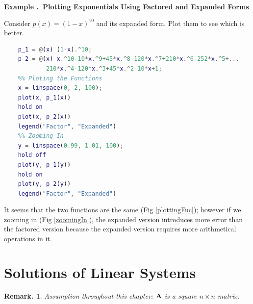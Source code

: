 \documentclass[12pt, a4paper]{article}
\newcounter{index}[subsection]
\newenvironment*{eg}[1]{\begin{framed}\par\noindent\textbf{Example \thesubsection.\stepcounter{index}\theindex\ #1} \par}{\par\end{framed}}
\newtheorem{rmk}{Remark.}[section]
\def\A{\vb A}
\begin{document}
\begin{eg}{Plotting Exponentials Using Factored and Expanded Forms}
	Consider $p(x)=(1-x)^{10}$ and its expanded form.
	Plot them to see which is better. 
	\begin{lstlisting}[language = Matlab, title = {Example 1.4.5}]
	%% Defining the Functions
	p_1 = @(x) (1-x).^10;
	p_2 = @(x) x.^10-10*x.^9+45*x.^8-120*x.^7+210*x.^6-252*x.^5+...
			210*x.^4-120*x.^3+45*x.^2-10*x+1;
	%% Ploting the Functions
	x = linspace(0, 2, 100);
	plot(x, p_1(x))
	hold on
	plot(x, p_2(x))
	legend("Factor", "Expanded")
	%% Zooming In
	y = linspace(0.99, 1.01, 100);
	hold off
	plot(y, p_1(y))
	hold on
	plot(y, p_2(y))
	legend("Factor", "Expanded")
	\end{lstlisting}
	\begin{figure}[H]\centering
	\hfill
	\end{figure}
	It seems that the two functions are the same (Fig \ref{plottingFuc}); however if we zooming in (Fig \ref{zoomingIn}), the expanded version introduces more error than the factored version because the expanded version requires more arithmetical operations in it. 
	\end{eg}

\newpage
\section{Solutions of Linear Systems}
\begin{rmk} Assumption throughout this chapter: $\A$ is a square $n\times n$ matrix. \end{rmk}
\end{document}
